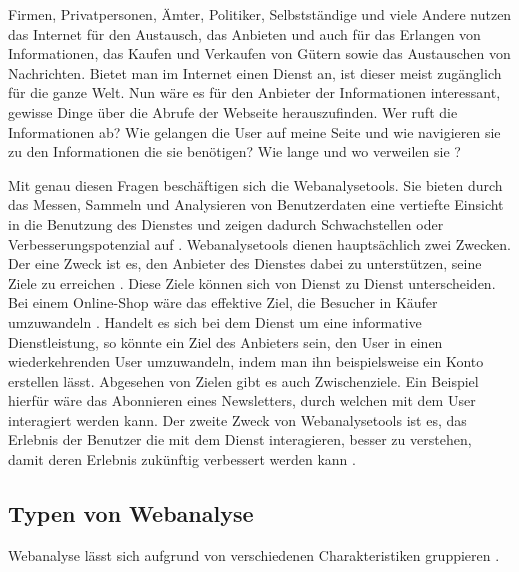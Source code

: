 Firmen, Privatpersonen, Ämter, Politiker, Selbstständige und viele Andere nutzen das Internet für den Austausch, das Anbieten und auch für das Erlangen von Informationen, das Kaufen und Verkaufen von Gütern sowie das Austauschen von Nachrichten. Bietet man im Internet einen Dienst an, ist dieser meist zugänglich für die ganze Welt. Nun wäre es für den Anbieter der Informationen interessant, gewisse Dinge über die Abrufe der Webseite herauszufinden. Wer ruft die Informationen ab? Wie gelangen die User auf meine Seite und wie navigieren sie zu den Informationen die sie benötigen? Wie lange und wo verweilen sie \parencite[S. 175]{nakatani2011toolselectionmethod}?

Mit genau diesen Fragen beschäftigen sich die Webanalysetools. Sie bieten durch das Messen, Sammeln und Analysieren von Benutzerdaten eine vertiefte Einsicht in die Benutzung des Dienstes und zeigen dadurch Schwachstellen oder Verbesserungspotenzial auf \parencite[S. 1]{waisberg2009webShort}. 
Webanalysetools dienen hauptsächlich zwei Zwecken. Der eine Zweck ist es, den Anbieter des Dienstes dabei zu unterstützen, seine Ziele zu erreichen \parencite[S. 56]{AnalyticsForDummies}. Diese Ziele können sich von Dienst zu Dienst unterscheiden. Bei einem Online-Shop wäre das effektive Ziel, die Besucher in Käufer umzuwandeln \parencite[S. 28]{AnalyticsForDummies}. Handelt es sich bei dem Dienst um eine informative Dienstleistung, so könnte ein Ziel des Anbieters sein, den User in einen wiederkehrenden User umzuwandeln, indem man ihn beispielsweise ein Konto erstellen lässt. Abgesehen von Zielen gibt es auch Zwischenziele. Ein Beispiel hierfür wäre das Abonnieren eines Newsletters, durch welchen mit dem User interagiert werden kann. Der zweite Zweck von Webanalysetools ist es, das Erlebnis der Benutzer die mit dem Dienst interagieren, besser zu verstehen, damit deren Erlebnis zukünftig verbessert werden kann \parencite[S. 1]{waisberg2009webShort}.

\subsection{Typen von Webanalyse}

Webanalyse lässt sich aufgrund von verschiedenen Charakteristiken gruppieren \parencite[S. 172-174]{nakatani2011toolselectionmethod}.

